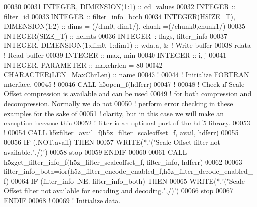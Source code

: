\begin{DoxyCode}
00030 
00031   \textcolor{keywordtype}{INTEGER}, \textcolor{keywordtype}{DIMENSION(1:1)} :: cd\_values
00032   \textcolor{keywordtype}{INTEGER} :: filter\_id
00033   \textcolor{keywordtype}{INTEGER} :: filter\_info\_both
00034   \textcolor{keywordtype}{INTEGER(HSIZE\_T)}, \textcolor{keywordtype}{DIMENSION(1:2)} :: dims = (/dim0, dim1/), chunk =(/chunk0,chunk1/)
00035   \textcolor{keywordtype}{INTEGER(SIZE\_T)} :: nelmts
00036   \textcolor{keywordtype}{INTEGER} :: flags, filter\_info
00037   \textcolor{keywordtype}{INTEGER}, \textcolor{keywordtype}{DIMENSION(1:dim0, 1:dim1)} :: wdata, & \textcolor{comment}{! Write buffer }
00038                                                  rdata    \textcolor{comment}{! Read buffer}
00039   \textcolor{keywordtype}{INTEGER} :: max, min
00040   \textcolor{keywordtype}{INTEGER} :: i, j
00041   \textcolor{keywordtype}{INTEGER}, \textcolor{keywordtype}{PARAMETER} :: maxchrlen = 80
00042   \textcolor{keywordtype}{CHARACTER(LEN=MaxChrLen)} :: name
00043   \textcolor{comment}{!}
00044   \textcolor{comment}{! Initialize FORTRAN interface.}
00045   \textcolor{comment}{!}
00046   \textcolor{keyword}{CALL }h5open\_f(hdferr)
00047   \textcolor{comment}{! }
00048   \textcolor{comment}{! Check if Scale-Offset compression is available and can be used}
00049   \textcolor{comment}{! for both compression and decompression.  Normally we do not}
00050   \textcolor{comment}{! perform error checking in these examples for the sake of}
00051   \textcolor{comment}{! clarity, but in this case we will make an exception because this}
00052   \textcolor{comment}{! filter is an optional part of the hdf5 library.}
00053   \textcolor{comment}{!  }
00054   \textcolor{keyword}{CALL }h5zfilter\_avail\_f(h5z\_filter\_scaleoffset\_f, avail, hdferr)
00055 
00056   \textcolor{keywordflow}{IF} (.NOT.avail) \textcolor{keywordflow}{THEN}
00057      \textcolor{keyword}{WRITE}(*,\textcolor{stringliteral}{'("Scale-Offset filter not available.",/)'})
00058      stop
00059 \textcolor{keywordflow}{  ENDIF}
00060 
00061   \textcolor{keyword}{CALL }h5zget\_filter\_info\_f(h5z\_filter\_scaleoffset\_f, filter\_info, hdferr)
00062 
00063   filter\_info\_both=ior(h5z\_filter\_encode\_enabled\_f,h5z\_filter\_decode\_enabled\_f)
00064   \textcolor{keywordflow}{IF} (filter\_info .NE. filter\_info\_both) \textcolor{keywordflow}{THEN}
00065      \textcolor{keyword}{WRITE}(*,\textcolor{stringliteral}{'("Scale-Offset filter not available for encoding and decoding.",/)'})
00066      stop
00067 \textcolor{keywordflow}{  ENDIF}
00068   \textcolor{comment}{!}
00069   \textcolor{comment}{! Initialize data.}

\end{DoxyCode}

